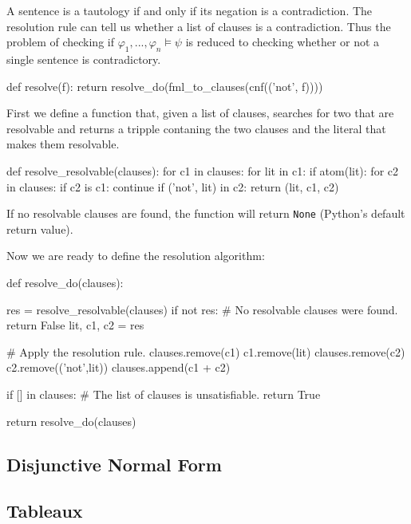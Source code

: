 \documentclass[a4paper,notitlepage]{scrartcl}
\let\phi\varphi
\begin{document}
A sentence is a tautology if and only if its negation is a contradiction.
The resolution rule can tell us whether a list of clauses is a contradiction.
Thus the problem of checking if $\phi_1,...,\phi_n\models\psi$ is reduced
   to checking whether or not a single sentence is contradictory.

\begin{code}
def resolve(f):
    return resolve_do(fml_to_clauses(cnf(('not', f))))
\end{code}

First we define a function that, given a list of clauses, searches for two
   that are resolvable and returns a tripple contaning the two clauses
   and the literal that makes them resolvable.

\begin{code}
def resolve_resolvable(clauses):
    for c1 in clauses:
        for lit in c1:
            if atom(lit):
                for c2 in clauses:
                    if c2 is c1:
                        continue
                    if ('not', lit) in c2:
                        return (lit, c1, c2)
\end{code}
If no resolvable clauses are found, the function will return \texttt{None}
   (Python's default return value).

Now we are ready to define the resolution algorithm:

\begin{code}
def resolve_do(clauses):

    res = resolve_resolvable(clauses)
    if not res:
        # No resolvable clauses were found.
        return False
    lit, c1, c2 = res

    # Apply the resolution rule.
    clauses.remove(c1)
    c1.remove(lit)
    clauses.remove(c2)
    c2.remove(('not',lit))
    clauses.append(c1 + c2)

    if [] in clauses:
        # The list of clauses is unsatisfiable.
        return True

    return resolve_do(clauses)
\end{code}


\subsection{Disjunctive Normal Form}

\subsection{Tableaux}
\end{document}
